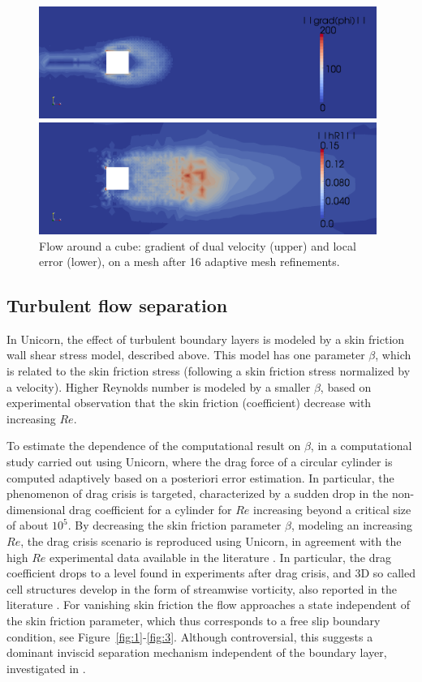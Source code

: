 \begin{figure}
\centering
\includegraphics[width=11cm]{chapters/hoffman-1/png/fig3a.png}

\medskip

\includegraphics[width=11cm]{chapters/hoffman-1/png/fig3b.png}
\caption{Flow around a cube: gradient of dual velocity (upper) and local error (lower), on a mesh after 16 adaptive mesh refinements.}
\label{fig:cube3}
\end{figure}


\subsection{Turbulent flow separation}

In Unicorn, the effect of turbulent boundary layers is modeled by a skin friction wall shear stress model, described above. This model has one parameter $\beta$, which is related to the skin friction stress (following \citet{Schumann1975} a skin friction stress normalized by a velocity). Higher Reynolds number is modeled by a smaller $\beta$, based on experimental observation that the skin friction (coefficient) decrease with increasing $Re$.

To estimate the dependence of the computational result on $\beta$, in \citet{HoffmanJansson2009} a computational study carried out using Unicorn, where the drag force of a circular cylinder is computed adaptively based on a posteriori error estimation. In particular, the phenomenon of drag crisis is targeted, characterized by a sudden drop in the non-dimensional drag coefficient for a cylinder for $Re$ increasing beyond a critical size of about $10^5$. By decreasing the skin friction parameter $\beta$, modeling an increasing $Re$, the drag crisis scenario is reproduced using Unicorn, in agreement with the high $Re$ experimental data available in the literature \citep{Zdravkovich2003}. In particular, the drag coefficient drops to a level found in experiments after drag crisis, and 3D so called cell structures develop in the form of streamwise vorticity, also reported in the literature \citep{Zdravkovich2003}.
For vanishing skin friction the flow approaches a state independent of the skin friction parameter, which thus corresponds to a free slip boundary condition, see Figure~\ref{fig:1}-\ref{fig:3}. Although controversial, this suggests a dominant inviscid separation mechanism independent of the boundary layer, investigated in \citet{HoffmanJohnson2008b,HoffmanJansson2009}.


